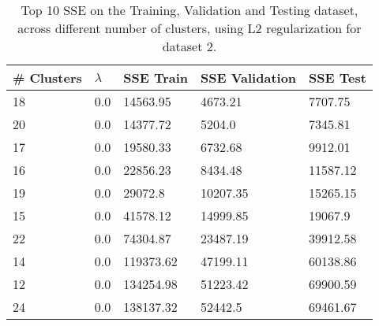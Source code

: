 \def\arraystretch{1.25}
\begin{table}[H]
\centering
\begin{tabular}{l l l l l}
\hline
\hline
\textbf{\# Clusters} & \textbf{$\lambda$} & \textbf{SSE Train} & \textbf{SSE Validation} & \textbf{SSE Test}\\
\hline
\hline
18 & 0.0 & 14563.95 & 4673.21 & 7707.75\\
20 & 0.0 & 14377.72 & 5204.0 & 7345.81\\
17 & 0.0 & 19580.33 & 6732.68 & 9912.01\\
16 & 0.0 & 22856.23 & 8434.48 & 11587.12\\
19 & 0.0 & 29072.8 & 10207.35 & 15265.15\\
15 & 0.0 & 41578.12 & 14999.85 & 19067.9\\
22 & 0.0 & 74304.87 & 23487.19 & 39912.58\\
14 & 0.0 & 119373.62 & 47199.11 & 60138.86\\
12 & 0.0 & 134254.98 & 51223.42 & 69900.59\\
24 & 0.0 & 138137.32 & 52442.5 & 69461.67\\
\hline
\end{tabular}
\caption{Top 10 SSE on the Training, Validation and Testing dataset, across different number of clusters, using L2 regularization for dataset 2.}
\end{table}